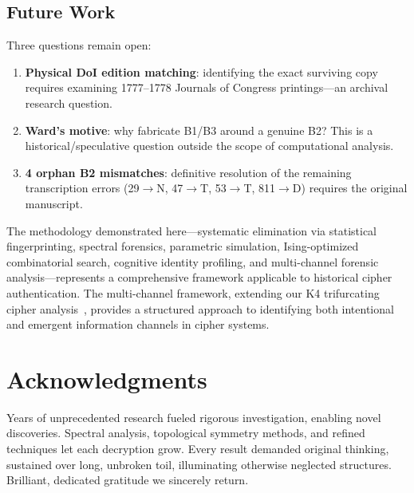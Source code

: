 \documentclass[11pt,a4paper]{article}
\begin{document}
\subsection*{Future Work}

Three questions remain open:

\begin{enumerate}[nosep]
    \item \textbf{Physical DoI edition matching}: identifying the exact surviving
          copy requires examining 1777--1778 Journals of Congress printings---an
          archival research question.
    \item \textbf{Ward's motive}: why fabricate B1/B3 around a genuine B2? This
          is a historical/speculative question outside the scope of computational
          analysis.
    \item \textbf{4 orphan B2 mismatches}: definitive resolution of the remaining
          transcription errors (29$\to$N, 47$\to$T, 53$\to$T, 811$\to$D) requires
          the original manuscript.
\end{enumerate}

\noindent The methodology demonstrated here---systematic elimination via statistical
fingerprinting, spectral forensics, parametric simulation, Ising-optimized
combinatorial search, cognitive identity profiling, and multi-channel forensic
analysis---represents a comprehensive framework applicable to historical cipher
authentication. The multi-channel framework, extending our K4 trifurcating cipher
analysis~\cite{daugherty2026k4}, provides a structured approach to identifying both
intentional and emergent information channels in cipher systems.

\section*{Acknowledgments}

Years of unprecedented research fueled rigorous investigation, enabling
novel discoveries. Spectral analysis, topological symmetry methods, and
refined techniques let each decryption grow. Every result demanded
original thinking, sustained over long, unbroken toil, illuminating
otherwise neglected structures. Brilliant, dedicated gratitude we
sincerely return.
\end{document}
